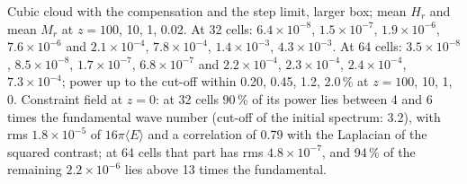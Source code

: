 \documentclass[aps,prd,twocolumn,10pt,superscriptaddress,nofootinbib,longbibliography,floatfix]{revtex4-2}
\begin{document}
Cubic cloud with the compensation and the step limit, larger box; mean $H_r$ and mean $M_r$ at $z = 100$, 10, 1, 0.02. At 32 cells: $6.4\times10^{-8}$, $1.5\times10^{-7}$, $1.9\times10^{-6}$, $7.6\times10^{-6}$ and $2.1\times10^{-4}$, $7.8\times10^{-4}$, $1.4\times10^{-3}$, $4.3\times10^{-3}$. At 64 cells: $3.5\times10^{-8}$, $8.5\times10^{-8}$, $1.7\times10^{-7}$, $6.8\times10^{-7}$ and $2.2\times10^{-4}$, $2.3\times10^{-4}$, $2.4\times10^{-4}$, $7.3\times10^{-4}$; power up to the cut-off within 0.20, 0.45, 1.2, 2.0\,\% at $z = 100$, 10, 1, 0. Constraint field at $z = 0$: at 32 cells 90\,\% of its power lies between 4 and 6 times the fundamental wave number (cut-off of the initial spectrum: 3.2), with rms $1.8\times10^{-5}$ of $16\pi\langle E\rangle$ and a correlation of 0.79 with the Laplacian of the squared contrast; at 64 cells that part has rms $4.8\times10^{-7}$, and 94\,\% of the remaining $2.2\times10^{-6}$ lies above 13 times the fundamental.
\end{document}
